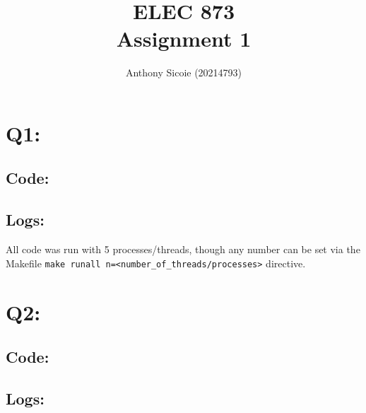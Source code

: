\documentclass[11pt]{article}
\title{%
  ELEC 873 \\
Assignment 1}
\author{Anthony Sicoie (20214793)}
\begin{document}
\maketitle


\section*{Q1:}

\subsection*{Code:}




\subsection*{Logs:}
All code was run with 5 processes/threads, though any number can be set via the Makefile \texttt{make runall n=<number\_of\_threads/processes>} directive. 




\section*{Q2:}

\subsection*{Code:}




\subsection*{Logs:}



\end{document}
